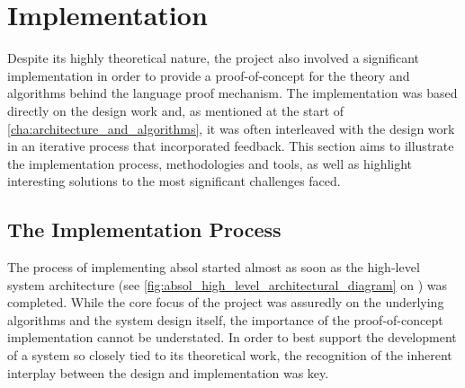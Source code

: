 

\chapter{Implementation} %
\label{cha:implementation}
Despite its highly theoretical nature, the project also involved a significant implementation in order to provide a proof-of-concept for the theory and algorithms behind the language proof mechanism. 
The implementation was based directly on the design work and, as mentioned at the start of \autoref{cha:architecture_and_algorithms}, it was often interleaved with the design work in an iterative process that incorporated feedback. 
This section aims to illustrate the implementation process, methodologies and tools, as well as highlight interesting solutions to the most significant challenges faced. 

\section{The Implementation Process} %
\label{sec:the_implementation_process}

The process of implementing \gls{absol} started almost as soon as the high-level system architecture (see \autoref{fig:absol_high_level_architectural_diagram} on ) was completed. 
While the core focus of the project was assuredly on the underlying algorithms and the system design itself, the importance of the proof-of-concept implementation cannot be understated. 
In order to best support the development of a system so closely tied to its theoretical work, the recognition of the inherent interplay between the design and implementation was key. \\

